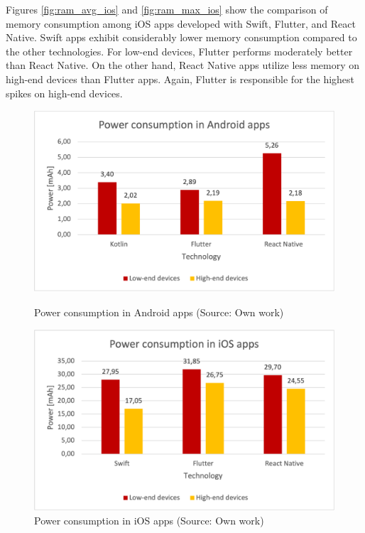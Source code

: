 Figures \ref{fig:ram_avg_ios} and \ref{fig:ram_max_ios} show the comparison of memory consumption among iOS apps developed with Swift, Flutter, and React Native. Swift apps exhibit considerably lower memory consumption compared to the other technologies. For low-end devices, Flutter performs moderately better than React Native. On the other hand, React Native apps utilize less memory on high-end devices than Flutter apps. Again, Flutter is responsible for the highest spikes on high-end devices.

\begin{figure}[H]
    \begin{minipage}{.48\textwidth}
        \includegraphics[width=\textwidth]{img/power_android}
        \caption{Power consumption in Android apps (Source: Own work)}
        \label{fig:power_android}
    \end{minipage}
    \hfill
    \begin{minipage}{.48\textwidth}
        \includegraphics[width=\textwidth]{img/power_ios}
        \caption{Power consumption in iOS apps (Source: Own work)}
        \label{fig:power_ios}
    \end{minipage}
\end{figure}

